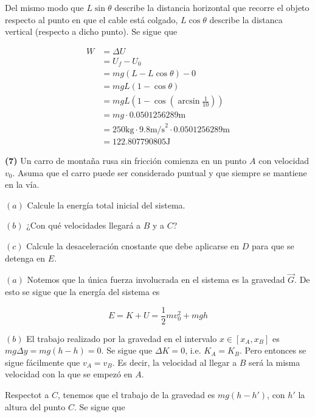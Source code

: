 \documentclass[12pt]{article}
\theoremstyle{definition}
\begin{document}
Del mismo modo que $L \sin \theta$ describe la distancia horizontal que recorre
el objeto respecto al punto en que el cable está colgado, $L \cos \theta$
describe la distanca vertical (respecto a dicho punto). Se sigue que 

\begin{align*}
    W 
    &= \Delta U \\ 
    &= U_f - U_0 \\ 
    &= mg( L - L \cos \theta ) - 0 \\ 
    &= mgL(1 - \cos \theta)\\ 
    &= mgL (1 - \cos \left( \arcsin \frac{1}{10} \right) )\\ 
    &= mg \cdot 0.0501256289\text{m}\\ 
    &= 250\text{kg} \cdot 9.8 \text{m/s}^2 \cdot 0.0501256289 \text{m} \\ 
    &= 122.807790805\text{J}
\end{align*}

\pagebreak 

\begin{shaded}
    \textbf{(7)} Un carro de montaña rusa sin fricción comienza en un punto $A$
    con velocidad $v_0$. Asuma que el carro puede ser considerado puntual y que
    siempre se mantiene en la vía. 

    $(a)$ Calcule la energía total inicial del sistema. 

    $(b)$ ¿Con qué velocidades llegará a $B$ y a $C$?

    $(c)$ Calcule la desaceleración cnostante que debe aplicarse en $D$ para que
    se detenga en $E$.
\end{shaded}

$(a)$ Notemos que la única fuerza involucrada en el sistema es la gravedad
$\vec{G}$. De esto se sigue que la energía del sistema es 

\begin{equation*}
    E 
    = K + U 
    = \frac{1}{2}mv_0^2 + mg h
\end{equation*}

$(b)$ El trabajo realizado por la gravedad en el intervalo $x \in [x_A, x_B]$ es 
$mg \Delta y = mg(h - h) = 0$. Se sigue que $\Delta K = 0$, i.e. $K_A = K_B$.
Pero entonces se sigue fácilmente que $v_A = v_B$. Es decir, la velocidad al
llegar a $B$ será la misma velocidad con la que se empezó en $A$.

Respectot a $C$, tenemos que el trabajo de la gravedad es $mg(h - h')$, con $h'$
la altura del punto $C$. Se sigue que 
\end{document}
